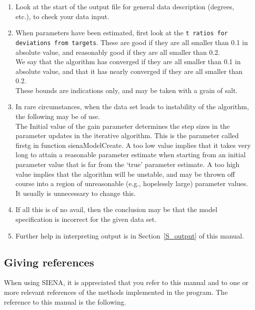 \documentclass[a4paper,fleqn,11pt]{article}
\newcommand{\+}{\, + \,}
\newcommand{\si}{{\sf SIENA}}
\begin{document}
{\begin{enumerate}
\item Look at the start of the output file for general data
      description (degrees, etc.), to check your data input.
    \item When parameters have been estimated, first look at the \texttt{t
        ratios for deviations from targets}.  These are good if they are all
      smaller than 0.1 in absolute
      value, and reasonably good if they are all smaller than 0.2.\\
      We say that the algorithm has converged if they are all smaller than 0.1
      in absolute value, and that it has nearly converged if they are all
      smaller than 0.2.\\
      These bounds are indications only, and may be taken with a grain of
      salt.
\item In rare circumstances, when the data set leads to instability
      of the algorithm, the following may be of use.\\
      The \textsf{Initial value of the gain parameter} determines the
      step sizes in the parameter updates in the iterative
      algorithm.
      This is the parameter called \textsf{firstg}
      in function \textsf{sienaModelCreate}.
      A too low value implies that it takes very long to attain a
      reasonable parameter estimate when starting from an initial
      parameter value that is far from the `true' parameter estimate.
      A too high value implies that the algorithm will be unstable,
      and may be thrown off course into a region of unreasonable
      (e.g., hopelessly large) parameter values.\\
      It usually is unnecessary to change
      this.
    \item If all this is of no avail, then the conclusion may be that the model
      specification is incorrect for the given data set.
    \item Further help in interpreting output is in Section~\ref{S_output} of
      this manual.
\end{enumerate}

\subsection{Giving references}

When using \si, it is appreciated that you refer to this manual and to one or
more relevant references of the methods implemented in the program.  The
reference to this manual is the following.  \smallskip

}
\end{document}
